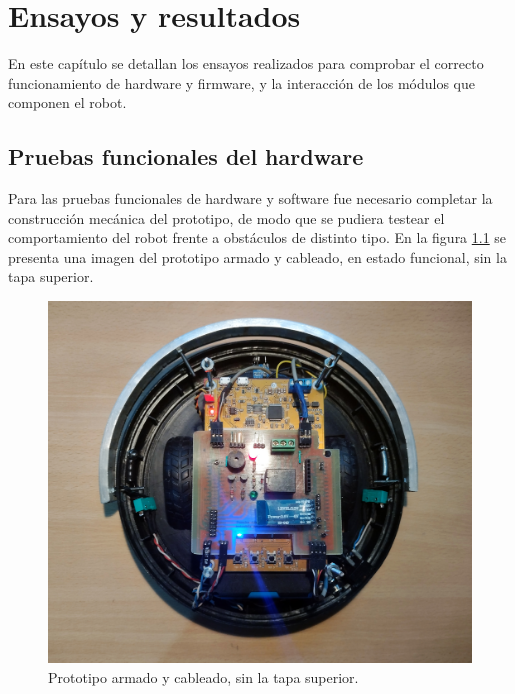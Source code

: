 
\chapter{Ensayos y resultados} %

\label{Chapter4} %



En este capítulo se detallan los ensayos realizados para comprobar el correcto funcionamiento de hardware y firmware, y la interacción de los módulos que componen el robot.

\section{Pruebas funcionales del hardware}
\label{sec:pruebasHW}

Para las pruebas funcionales de hardware y software fue necesario completar la construcción mecánica del prototipo, de modo que se pudiera testear el comportamiento del robot frente a obstáculos de distinto tipo. 
En la figura \ref{fig:armado1} se presenta una imagen del prototipo armado y cableado, en estado funcional, sin la tapa superior. 

\begin{figure}[h]
	\centering
	\includegraphics[width=14cm]{./Figures/armado1.jpg}
	\caption{Prototipo armado y cableado, sin la tapa superior.}
	\label{fig:armado1}
\end{figure}

